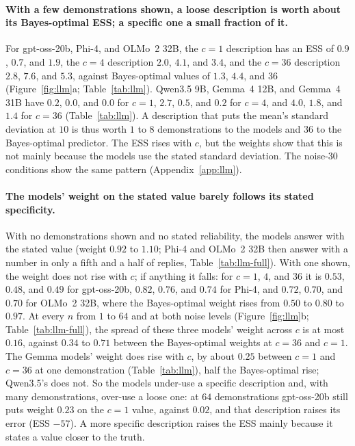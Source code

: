 \documentclass{article}
\begin{document}
\paragraph{With a few demonstrations shown, a loose description is worth about its Bayes-optimal ESS; a specific one a small fraction of it.} For gpt-oss-20b, Phi-4, and OLMo~2 32B, the $c = 1$ description has an ESS of $0.9$, $0.7$, and $1.9$, the $c = 4$ description $2.0$, $4.1$, and $3.4$, and the $c = 36$ description $2.8$, $7.6$, and $5.3$, against Bayes-optimal values of $1.3$, $4.4$, and $36$ (Figure~\ref{fig:llm}a; Table~\ref{tab:llm}). Qwen3.5 9B, Gemma~4 12B, and Gemma~4 31B have $0.2$, $0.0$, and $0.0$ for $c = 1$, $2.7$, $0.5$, and $0.2$ for $c = 4$, and $4.0$, $1.8$, and $1.4$ for $c = 36$ (Table~\ref{tab:llm}). A description that puts the mean's standard deviation at $10$ is thus worth $1$ to $8$ demonstrations to the models and $36$ to the Bayes-optimal predictor. The ESS rises with $c$, but the weights show that this is not mainly because the models use the stated standard deviation. The noise-$30$ conditions show the same pattern (Appendix~\ref{app:llm}).

\paragraph{The models' weight on the stated value barely follows its stated specificity.} With no demonstrations shown and no stated reliability, the models answer with the stated value (weight $0.92$ to $1.10$; Phi-4 and OLMo~2 32B then answer with a number in only a fifth and a half of replies, Table~\ref{tab:llm-full}). With one shown, the weight does not rise with $c$; if anything it falls: for $c = 1$, $4$, and $36$ it is $0.53$, $0.48$, and $0.49$ for gpt-oss-20b, $0.82$, $0.76$, and $0.74$ for Phi-4, and $0.72$, $0.70$, and $0.70$ for OLMo~2 32B, where the Bayes-optimal weight rises from $0.50$ to $0.80$ to $0.97$. At every $n$ from $1$ to $64$ and at both noise levels (Figure~\ref{fig:llm}b; Table~\ref{tab:llm-full}), the spread of these three models' weight across $c$ is at most $0.16$, against $0.34$ to $0.71$ between the Bayes-optimal weights at $c = 36$ and $c = 1$. The Gemma models' weight does rise with $c$, by about $0.25$ between $c = 1$ and $c = 36$ at one demonstration (Table~\ref{tab:llm}), half the Bayes-optimal rise; Qwen3.5's does not. So the models under-use a specific description and, with many demonstrations, over-use a loose one: at $64$ demonstrations gpt-oss-20b still puts weight $0.23$ on the $c = 1$ value, against $0.02$, and that description raises its error (ESS $-57$). A more specific description raises the ESS mainly because it states a value closer to the truth.
\end{document}
